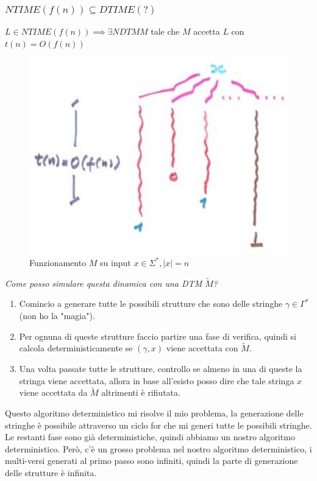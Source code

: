 \documentclass{article}
\begin{document}
\subsubsection{$NTIME(f(n))\subseteq DTIME(?)$}
$L\in NTIME(f(n))\implies\exists NDTM M$ tale che $M$ accetta $L$ con $t(n)=O(f(n))$
\begin{figure}[H]
    \centering
    \includegraphics[scale=0.6]{images/ndtmfunct.png}
    \caption{Funzionamento $M$ su input $x\in\Sigma^*,|x|=n$}
\end{figure}
\textit{Come posso simulare questa dinamica con una DTM $\tilde{M}$?}
\begin{enumerate}
    \item Comincio a generare tutte le possibili strutture che sono delle stringhe $\gamma\in\Gamma^*$ (non ho
la "magia").

\item Per ognuna di queste strutture faccio partire una fase di verifica, quindi si
calcola deterministicamente se $(\gamma,x)$ viene accettata con $\tilde{M}$.

\item Una volta passate tutte le strutture, controllo se almeno in una di queste
la stringa viene accettata, allora in base all'esisto posso dire che tale stringa $x$ viene accettata
da $\tilde{M}$ altrimenti è rifiutata.

\end{enumerate}
Questo algoritmo deterministico mi risolve il mio problema, la generazione delle stringhe
è possibile attraverso un ciclo for che mi generi tutte le possibili stringhe. Le restanti
fase sono già deterministiche, quindi abbiamo un nostro algoritmo deterministico.
Però, c'è un grosso problema nel nostro algoritmo deterministico, i multi-versi generati
al primo passo sono infiniti, quindi la parte di generazione delle strutture è infinita.
\end{document}
